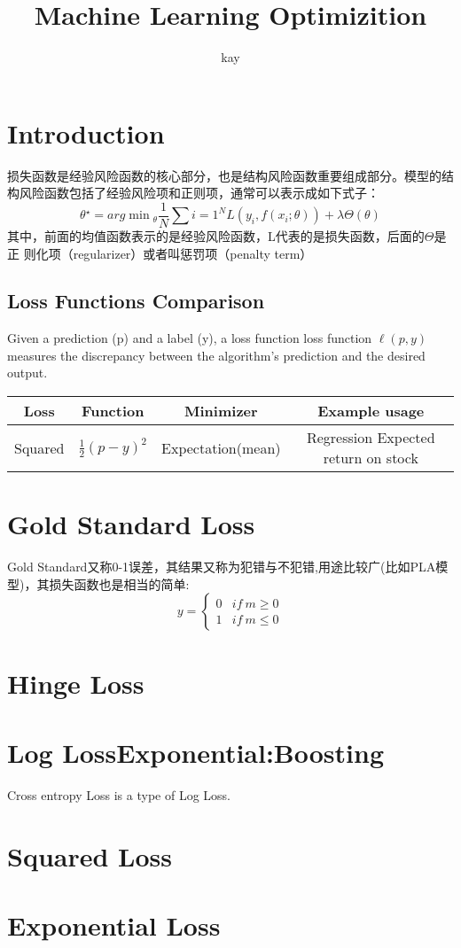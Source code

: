 \documentclass[hyperref, UTF-8]{ctexart}
\author{kay}
\title{Machine Learning Optimizition}
\begin{document}
\maketitle
\tableofcontents

\section{Introduction}

损失函数是经验风险函数的核心部分，也是结构风险函数重要组成部分。模型的结构风险函数包括了经验风险项和正则项，通常可以表示成如下式子：
\begin{displaymath}
  \theta{^\star} = arg \min{_\theta} \frac{1}{N}\sum{i=1}^N \mathit{L} (y_i,
  f(x_i; \theta)) + \lambda \Theta(\theta)
\end{displaymath}
其中，前面的均值函数表示的是经验风险函数，L代表的是损失函数，后面的$\Theta$是正
则化项（regularizer）或者叫惩罚项（penalty term）

\subsection{Loss Functions Comparison}
Given a prediction (p) and a label (y), a loss function loss function
$\ell(p,y)$ measures the discrepancy between the algorithm's prediction and the
desired output.   \\
\begin{tabular}{|c|c|c|c|}
  \hline
  Loss & Function & Minimizer & Example usage \\ \hline
  Squared & $\frac{1}{2}(p-y)^2$ & Expectation(mean) & Regression Expected return on stock \\  \hline
\end{tabular}

\section{Gold Standard Loss}
Gold Standard又称0-1误差，其结果又称为犯错与不犯错,用途比较广(比如PLA模型)，其损失函数也是相当的简单:
\begin{displaymath}
  y = \left \{
      \begin{array}{ll}
        0 & if ~ m \geqslant 0  \\
        1 &  if ~ m \leqslant 0 
      \end{array}  \right.
\end{displaymath}

\section{Hinge Loss}

\section{Log LossExponential:Boosting}
Cross entropy Loss is a type of Log Loss.

\section{Squared Loss}

\section{Exponential Loss}
\end{document}
